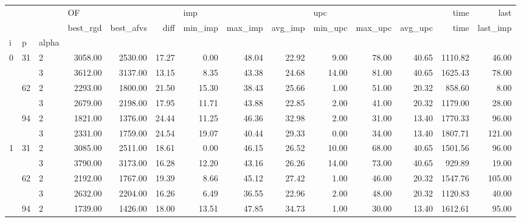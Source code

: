 \begin{tabular}{lllrrrrrrrrrrr}
\toprule
  &    &   & \multicolumn{3}{l}{OF} & \multicolumn{3}{l}{imp} & \multicolumn{3}{l}{upc} &    time &     last \\
  &    &   & best\_rgd & best\_afvs &  diff & min\_imp & max\_imp & avg\_imp & min\_upc & max\_upc & avg\_upc &    time & last\_imp \\
i & p & alpha &          &           &       &         &         &         &         &         &         &         &          \\
\midrule
\multirow{6}{*}{0} & \multirow{2}{*}{31} & 2 &  3058.00 &   2530.00 & 17.27 &    0.00 &   48.04 &   22.92 &    9.00 &   78.00 &   40.65 & 1110.82 &    46.00 \\
  &    & 3 &  3612.00 &   3137.00 & 13.15 &    8.35 &   43.38 &   24.68 &   14.00 &   81.00 &   40.65 & 1625.43 &    78.00 \\
\cline{2-14}
  & \multirow{2}{*}{62} & 2 &  2293.00 &   1800.00 & 21.50 &   15.30 &   38.43 &   25.66 &    1.00 &   51.00 &   20.32 &  858.60 &     8.00 \\
  &    & 3 &  2679.00 &   2198.00 & 17.95 &   11.71 &   43.88 &   22.85 &    2.00 &   41.00 &   20.32 & 1179.00 &    28.00 \\
\cline{2-14}
  & \multirow{2}{*}{94} & 2 &  1821.00 &   1376.00 & 24.44 &   11.25 &   46.36 &   32.98 &    2.00 &   31.00 &   13.40 & 1770.33 &    96.00 \\
  &    & 3 &  2331.00 &   1759.00 & 24.54 &   19.07 &   40.44 &   29.33 &    0.00 &   34.00 &   13.40 & 1807.71 &   121.00 \\
\cline{1-14}
\cline{2-14}
\multirow{6}{*}{1} & \multirow{2}{*}{31} & 2 &  3085.00 &   2511.00 & 18.61 &    0.00 &   46.15 &   26.52 &   10.00 &   68.00 &   40.65 & 1501.56 &    96.00 \\
  &    & 3 &  3790.00 &   3173.00 & 16.28 &   12.20 &   43.16 &   26.26 &   14.00 &   73.00 &   40.65 &  929.89 &    19.00 \\
\cline{2-14}
  & \multirow{2}{*}{62} & 2 &  2192.00 &   1767.00 & 19.39 &    8.66 &   45.12 &   27.42 &    1.00 &   46.00 &   20.32 & 1547.76 &   105.00 \\
  &    & 3 &  2632.00 &   2204.00 & 16.26 &    6.49 &   36.55 &   22.96 &    2.00 &   48.00 &   20.32 & 1120.83 &    40.00 \\
\cline{2-14}
  & \multirow{2}{*}{94} & 2 &  1739.00 &   1426.00 & 18.00 &   13.51 &   47.85 &   34.73 &    1.00 &   30.00 &   13.40 & 1612.61 &    95.00 \\

\end{tabular}
